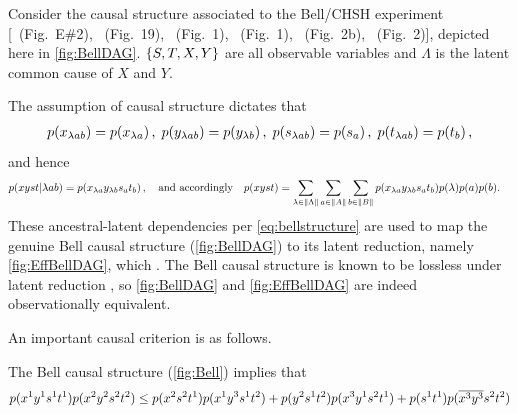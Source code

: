 Consider the causal structure associated to the Bell/CHSH \cite{bell1964einstein,Brunner2013Bell,bell1966lhvm,CHSHOriginal} experiment [\citealp{pusey2014gdag}~(Fig.~E\#2), \citealp{WoodSpekkens}~(Fig.~19), \citealp{chaves2014novel}~(Fig.~1), \citealp{BeyondBellII}~(Fig.~1), \citealp{wolfe2015nonconvexity}~(Fig.~2b), \citealp{steeg2011relaxation}~(Fig.~2)], depicted here in \cref{fig:BellDAG}. $\left\lbrace S,T,X,Y\right\rbrace$ are all observable variables and $\Lambda$ is the latent common cause of $X$ and $Y$.

The assumption of causal structure dictates that
\begin{align}\begin{split}\label{eq:bellstructure}
\p{x_{\lambda a b}}=\p{x_{\lambda a}} \,,\; \p{y_{\lambda a b}}=\p{y_{\lambda b}} \,,\; \p{s_{\lambda a b}}=\p{s_{a}} \,,\; \p{t_{\lambda a b}}=\p{t_{b}} \,,%
\end{split}\end{align}
and hence
\begin{align}\begin{split}\label{eq:bellintegration}
&p\lparen x y s t | \lambda a b\rparen=p\lparen x_{\lambda a} y_{\lambda b} s_a t_b\rparen\,,\quad\text{and accordingly}\quad p\lparen x y s t\rparen=\sum\limits_{{\lambda\in \lVert\Lambda\rVert}}\sum\limits_{{a\in \lVert A\rVert}}\sum\limits_{{b\in \lVert B\rVert}}p\lparen x_{\lambda a} y_{\lambda b} s_a t_b\rparen p\lparen\lambda\rparen p\lparen a\rparen p\lparen b\rparen.
\end{split}\end{align}
These ancestral-latent dependencies per \cref{eq:bellstructure} are used to map the genuine Bell causal structure (\cref{fig:BellDAG}) to its latent reduction, namely \cref{fig:EffBellDAG}, which . The Bell causal structure is known to be lossless under latent reduction \citep[Thm.~2.4]{fritz2012bell}, so \cref{fig:BellDAG} and \cref{fig:EffBellDAG} are indeed observationally equivalent.

An important causal criterion is as follows. 
\begin{prop} \label{prop:CH}
The Bell causal structure (\cref{fig:Bell}) implies that
\begin{align*}
p\lparen x^1 y^1 s^1 t^1\rparen p\lparen x^2 y^2 s^2 t^2\rparen
\leq
p\lparen x^2 s^2 t^1\rparen p\lparen x^1 y^3 s^1 t^2\rparen
+p\lparen y^2 s^1 t^2\rparen p\lparen x^3 y^1 s^2 t^1\rparen
+p\lparen s^1 t^1\rparen p\lparen\overline{x^3} \overline{y^3} s^2 t^2\rparen
\end{align*}
\end{prop}

